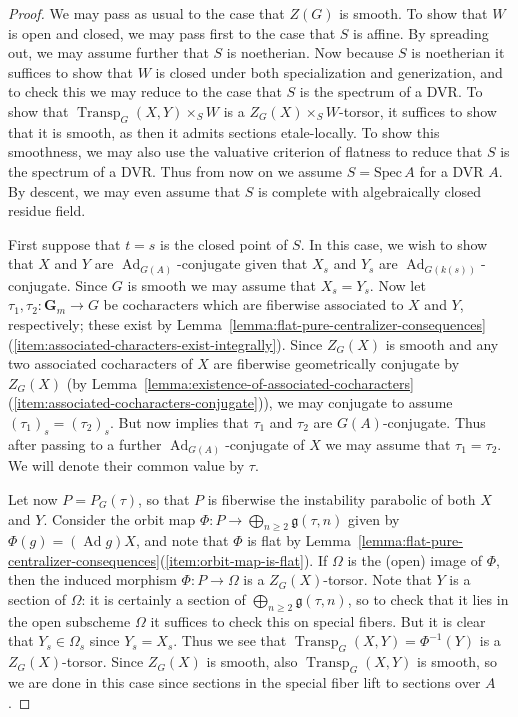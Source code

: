 \documentclass[11pt,reqno]{amsart}
\theoremstyle{definition}
\newcommand{\Spec}{\mathrm{Spec} \,}
\newcommand{\bG}{{\mathbf G}}
\newcommand{\fg}{\mathfrak{g}}
\DeclareMathOperator{\Ad}{Ad}
\DeclareMathOperator{\Transp}{Transp}
\begin{document}
\begin{proof}
We may pass as usual to the case that $Z(G)$ is smooth. To show that $W$ is open and closed, we may pass first to the case that $S$ is affine. By spreading out, we may assume further that $S$ is noetherian. Now because $S$ is noetherian it suffices to show that $W$ is closed under both specialization and generization, and to check this we may reduce to the case that $S$ is the spectrum of a DVR. To show that $\Transp_G(X, Y) \times_S W$ is a $Z_G(X) \times_S W$-torsor, it suffices to show that it is smooth, as then it admits sections etale-locally. To show this smoothness, we may also use the valuative criterion of flatness \cite[IV\textsubscript{3}, Thm.\ 11.8.1]{EGA} to reduce that $S$ is the spectrum of a DVR. Thus from now on we assume $S = \Spec A$ for a DVR $A$. By descent, we may even assume that $S$ is complete with algebraically closed residue field. \smallskip

First suppose that $t = s$ is the closed point of $S$. In this case, we wish to show that $X$ and $Y$ are $\Ad_{G(A)}$-conjugate given that $X_s$ and $Y_s$ are $\Ad_{G(k(s))}$-conjugate. Since $G$ is smooth we may assume that $X_s = Y_s$. Now let $\tau_1, \tau_2: \bG_m \to G$ be cocharacters which are fiberwise associated to $X$ and $Y$, respectively; these exist by Lemma~\ref{lemma:flat-pure-centralizer-consequences}(\ref{item:associated-characters-exist-integrally}). Since $Z_G(X)$ is smooth and any two associated cocharacters of $X$ are fiberwise geometrically conjugate by $Z_G(X)$ (by Lemma~\ref{lemma:existence-of-associated-cocharacters}(\ref{item:associated-cocharacters-conjugate})), we may conjugate to assume $(\tau_1)_s = (\tau_2)_s$. But now \cite[Cor.\ B.3.5]{Conrad} implies that $\tau_1$ and $\tau_2$ are $G(A)$-conjugate. Thus after passing to a further $\Ad_{G(A)}$-conjugate of $X$ we may assume that $\tau_1 = \tau_2$. We will denote their common value by $\tau$. \smallskip

Let now $P = P_G(\tau)$, so that $P$ is fiberwise the instability parabolic of both $X$ and $Y$. Consider the orbit map $\Phi: P \to \bigoplus_{n \geq 2} \fg(\tau, n)$ given by $\Phi(g) = (\Ad g)X$, and note that $\Phi$ is flat by Lemma~\ref{lemma:flat-pure-centralizer-consequences}(\ref{item:orbit-map-is-flat}). If $\Omega$ is the (open) image of $\Phi$, then the induced morphism $\Phi: P \to \Omega$ is a $Z_G(X)$-torsor. Note that $Y$ is a section of $\Omega$: it is certainly a section of $\bigoplus_{n \geq 2} \fg(\tau, n)$, so to check that it lies in the open subscheme $\Omega$ it suffices to check this on special fibers. But it is clear that $Y_s \in \Omega_s$ since $Y_s = X_s$. Thus we see that $\Transp_G(X, Y) = \Phi^{-1}(Y)$ is a $Z_G(X)$-torsor. Since $Z_G(X)$ is smooth, also $\Transp_G(X, Y)$ is smooth, so we are done in this case since sections in the special fiber lift to sections over $A$. \smallskip


\end{proof}
\end{document}
